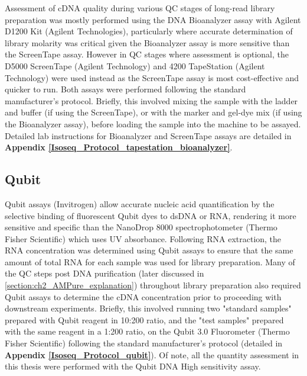 Assessment of cDNA quality during various QC stages of long-read library preparation was mostly performed using the DNA Bioanalyzer assay with Agilent D1200 Kit (Agilent Technologies), particularly where accurate determination of library molarity was critical given the Bioanalyzer assay is more sensitive than the ScreenTape assay. However in QC stages where assessment is optional, the D5000 ScreenTape (Agilent Technology) and 4200 TapeStation (Agilent Technology) were used instead as the ScreenTape assay is most cost-effective and quicker to run. Both assays were performed following the standard manufacturer's protocol. Briefly, this involved mixing the sample with the ladder and buffer (if using the ScreenTape), or with the marker and gel-dye mix (if using the Bioanalyzer assay), before loading the sample into the machine to be assayed. Detailed lab instructions for Bioanalyzer and ScreenTape assays are detailed in \textbf{Appendix \ref{Isoseq_Protocol_tapestation_bioanalyzer}}.

\subsection{Qubit}
\label{section:ch2_qubit}   
Qubit assays (Invitrogen) allow accurate nucleic acid quantification by the selective binding of fluorescent Qubit dyes to dsDNA or RNA, rendering it more sensitive and specific than the NanoDrop 8000 spectrophotometer (Thermo Fisher Scientific) which uses UV absorbance. Following RNA extraction, the RNA concentration was determined using Qubit assays to ensure that the same amount of total RNA for each sample was used for library preparation. Many of the QC steps post DNA purification (later discussed in \cref{section:ch2_AMPure_explanation}) throughout library preparation also required Qubit assays to determine the cDNA concentration prior to proceeding with downstream experiments. Briefly, this involved running two "standard samples" prepared with Qubit reagent in 10:200 ratio, and the "test samples" prepared with the same reagent in a 1:200 ratio, on the Qubit 3.0 Fluorometer (Thermo Fisher Scientific) following the standard manufacturer's protocol (detailed in \textbf{Appendix  \ref{Isoseq_Protocol_qubit}}). Of note, all the quantity assessment in this thesis were performed with the Qubit DNA High sensitivity assay.          

